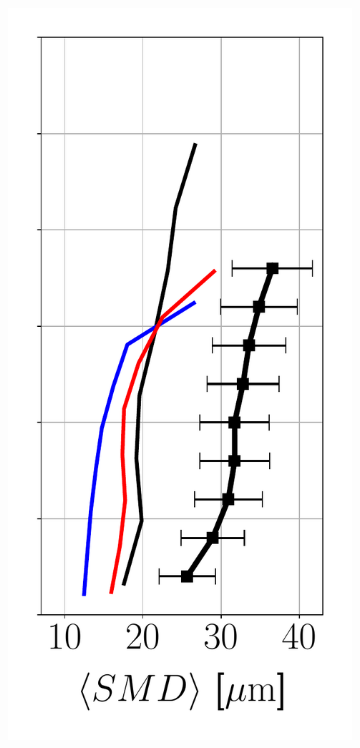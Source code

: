 \begin{figure}[h!]
\begin{subfigure}[b]{0.2\textwidth}
\end{subfigure}
\hspace*{0.5in}
\begin{subfigure}[b]{0.2\textwidth}
	\flushleft
   \includegraphics[scale=0.35]{./part2_developments/figures_ch6_lagrangian_JICF/params_breakup_model/profiles/SMD_along_z}

\end{subfigure}
\end{figure}

